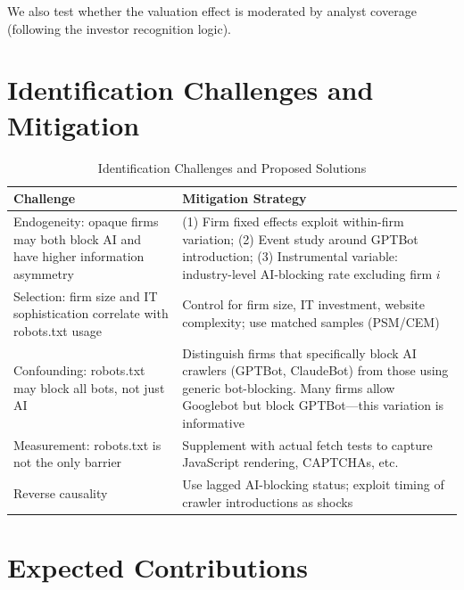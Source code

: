 \documentclass[12pt,a4paper]{article}
\begin{document}
We also test whether the valuation effect is moderated by analyst coverage (following the investor recognition logic).

\section{Identification Challenges and Mitigation}

\begin{table}[htbp]
\centering
\caption{Identification Challenges and Proposed Solutions}
\label{tab:identification}
\small
\begin{tabular}{p{4cm}p{8.5cm}}
\toprule
\textbf{Challenge} & \textbf{Mitigation Strategy} \\
\midrule
Endogeneity: opaque firms may both block AI and have higher information asymmetry & (1) Firm fixed effects exploit within-firm variation; (2) Event study around GPTBot introduction; (3) Instrumental variable: industry-level AI-blocking rate excluding firm $i$ \\
\addlinespace
Selection: firm size and IT sophistication correlate with robots.txt usage & Control for firm size, IT investment, website complexity; use matched samples (PSM/CEM) \\
\addlinespace
Confounding: robots.txt may block all bots, not just AI & Distinguish firms that specifically block AI crawlers (GPTBot, ClaudeBot) from those using generic bot-blocking. Many firms allow Googlebot but block GPTBot---this variation is informative \\
\addlinespace
Measurement: robots.txt is not the only barrier & Supplement with actual fetch tests to capture JavaScript rendering, CAPTCHAs, etc. \\
\addlinespace
Reverse causality & Use lagged AI-blocking status; exploit timing of crawler introductions as shocks \\
\bottomrule
\end{tabular}
\end{table}

\section{Expected Contributions}
\end{document}
